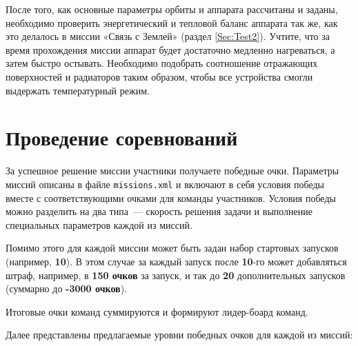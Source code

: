 \documentclass[12pt,a4paper]{article}
\begin{document}
После того, как основные параметры орбиты и аппарата рассчитаны и заданы, необходимо
проверить энергетический и тепловой баланс аппарата так же, как это делалось в миссии
«Связь с Землей» (раздел \ref{Sec:Test2}). Учтите, что за время прохождения миссии аппарат
будет достаточно медленно нагреваться, а затем быстро остывать.  Необходимо подобрать
соотношение отражающих поверхностей и радиаторов таким образом, чтобы все устройства
смогли выдержать температурный режим.

\clearpage
\section{Проведение соревнований}

За успешное решение миссии участники получаете победные очки. Параметры миссий описаны в
файле \verb'missions.xml' и включают в себя условия победы вместе с соответствующими
очками для команды участников. Условия победы можно разделить на два типа~--- скорость
решения задачи и выполнение специальных параметров каждой из миссий.

Помимо этого для каждой миссии может быть задан набор стартовых запусков (например,
\textbf{10}). В этом случае за каждый запуск после \textbf{10}-го может добавляться штраф,
например, в \textbf{150 очков} за запуск, и так до \textbf{20} дополнительных запусков
(суммарно до \textbf{-3000 очков}).

Итоговые очки команд суммируются и формируют лидер-боард команд.

Далее представлены предлагаемые уровни победных очков для каждой из миссий:
\end{document}
